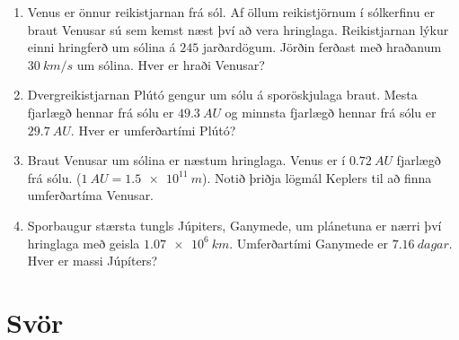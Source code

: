 \begin{enumerate}[label = \textbf{Dæmi \thechapter.\arabic*.}]
\item Venus er önnur reikistjarnan frá sól. Af öllum reikistjörnum í sólkerfinu er braut Venusar sú sem kemst næst því að vera hringlaga. Reikistjarnan lýkur einni hringferð um sólina á $245$ jarðardögum. Jörðin ferðast með hraðanum $\SI{30}{km/s}$ um sólina. Hver er hraði Venusar?

\item Dvergreikistjarnan Plútó gengur um sólu á sporöskjulaga braut. Mesta fjarlægð hennar frá sólu er $\SI{49.3}{AU}$ og minnsta fjarlægð hennar frá sólu er $\SI{29.7}{AU}$. Hver er umferðartími Plútó?


\item Braut Venusar um sólina er næstum hringlaga. Venus er í $\SI{0.72}{AU}$ fjarlægð frá sólu. ($\SI{1}{AU} = \SI{1.5e11}{m}$). Notið þriðja lögmál Keplers til að finna umferðartíma Venusar.

\item Sporbaugur stærsta tungls Júpiters, Ganymede, um plánetuna er nærri því hringlaga með geisla $\SI{1.07e6}{km}$. Umferðartími Ganymede er $\SI{7.16}{dagar}$. Hver er massi Júpíters?

\end{enumerate}


\section*{Svör}

